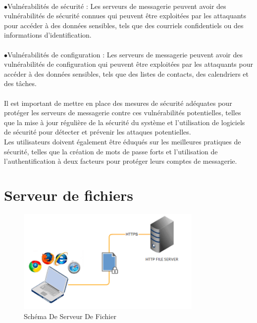 \paragraph{ }
$\bullet$Vulnérabilités de sécurité : Les serveurs de messagerie peuvent avoir des vulnérabilités de sécurité connues qui peuvent être exploitées par les attaquants pour accéder à des données sensibles, tels que des courriels confidentiels ou des informations d'identification.

\paragraph{ }
$\bullet$Vulnérabilités de configuration : Les serveurs de messagerie peuvent avoir des vulnérabilités de configuration qui peuvent être exploitées par les attaquants pour accéder à des données sensibles, tels que des listes de contacts, des calendriers et des tâches.
\paragraph{ }
Il est important de mettre en place des mesures de sécurité adéquates pour protéger les serveurs de messagerie contre ces vulnérabilités potentielles, telles que la mise à jour régulière de la sécurité du système et l'utilisation de logiciels de sécurité pour détecter et prévenir les attaques potentielles.\\
 Les utilisateurs doivent également être éduqués sur les meilleures pratiques de sécurité, telles que la création de mots de passe forts et l'utilisation de l'authentification à deux facteurs pour protéger leurs comptes de messagerie.\\
\section{Serveur de fichiers}
	\begin{figure}[h]
		\begin{center}
		
	\includegraphics[width=0.8\textwidth]{PhotoMemoire/serveur_fichier.png}
\caption{Schéma De Serveur De Fichier }
\end{center}
\end{figure}
